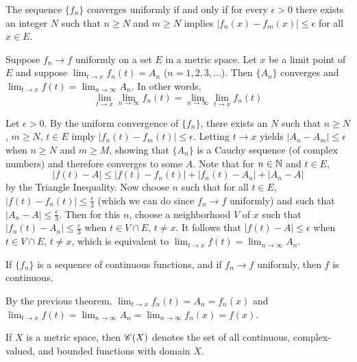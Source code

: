 \documentclass{mathnotes}
\begin{document}
\begin{prop}
  The sequence $\{f_n\}$ converges uniformly if and only if for every
  $\epsilon>0$ there exists an integer $N$ such that $n\ge N$ and $m\ge N$
  implies $|f_n(x)-f_m(x)|\le\epsilon$ for all $x\in E$.
\end{prop}

\begin{thm}
  Suppose $f_n\to f$ uniformly on a set $E$ in a metric space. Let $x$ be a
  limit point of $E$ and suppose $\lim_{t\to x}f_n(t)=A_n$ ($n=1,2,3,\ldots$).
  Then $\{A_n\}$ converges and $\lim_{t\to x}f(t)=\lim_{n\to\infty}A_n$. In
  other words,
  $$\lim_{t\to x}\lim_{n\to\infty}f_n(t)=\lim_{n\to\infty}\lim_{t\to x}f_n(t)$$
\end{thm}

\begin{pf}
  Let $\epsilon>0$. By the uniform convergence of $\{f_n\}$, there exists an
  $N$ such that $n\ge N$, $m\ge N$, $t\in E$ imply
  $|f_n(t)-f_m(t)|\le\epsilon$. Letting $t\to x$ yields $|A_n-A_m|\le\epsilon$
  when $n\ge N$ and $m\ge M$, showing that $\{A_n\}$ is a Cauchy sequence (of
  complex numbers) and therefore converges to some $A$. Note that for $n\in\mathbb{N}$
  and $t\in E$,
  $$|f(t)-A|\le|f(t)-f_n(t)|+|f_n(t)-A_n|+|A_n-A|$$
  by the Triangle Inequality. Now choose $n$ such that for all $t\in E$,
  $|f(t)-f_n(t)|\le\frac{\epsilon}{3}$ (which we can do since $f_n\to f$
  uniformly) and such that $|A_n-A|\le\frac{\epsilon}{3}$. Then for this $n$,
  choose a neighborhood $V$ of $x$ such that
  $|f_n(t)-A_n|\le\frac{\epsilon}{3}$ when $t\in V\cap E$, $t\neq x$. It
  follows that $|f(t)-A|\le\epsilon$ when $t\in V\cap E$, $t\neq x$, which is
  equivalent to $\lim_{t\to x}f(t)=\lim_{n\to\infty}A_n$.
\end{pf}

\begin{cor}
  If $\{f_n\}$ is a sequence of continuous functions, and if $f_n\to f$
  uniformly, then $f$ is continuous.
\end{cor}

\begin{pf}
  By the previous theorem, $\lim_{t\to x}f_n(t)=A_n=f_n(x)$ and $\lim_{t\to
  x}f(t)=\lim_{n\to\infty}A_n=\lim_{n\to\infty}f_n(x)=f(x)$.
\end{pf}

\begin{defi}
  If $X$ is a metric space, then $\mathscr{C}(X)$ denotes the set of all continuous,
  complex-valued, and bounded functions with domain $X$.
\end{defi}
\end{document}
